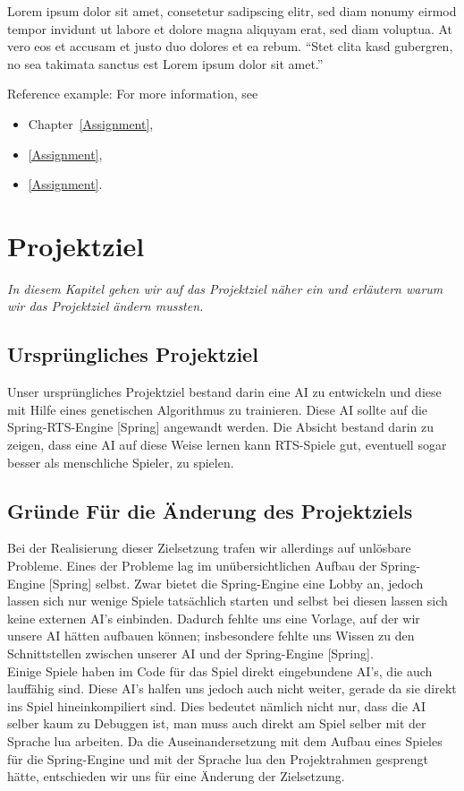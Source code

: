 \documentclass[
	12pt,
	a4paper,
	BCOR10mm,
	DIV14,
	headsepline,
	usegeometry,
]{scrreprt}
\begin{document}
Lorem ipsum dolor sit amet, consetetur sadipscing elitr, sed diam nonumy eirmod tempor invidunt ut labore et dolore magna aliquyam erat, sed diam voluptua.
At vero eos et accusam et justo duo dolores et ea rebum.
“Stet clita kasd gubergren, no sea takimata sanctus est Lorem ipsum dolor sit amet.”~\cite{Quelle2012}

\medskip

Reference example: For more information, see
\begin{itemize}
	\item Chapter~\ref{Assignment},
	\item \cref{Assignment},
	\item \vref{Assignment}.
\end{itemize}

\chapter{Projektziel}
\label{Projektziel}

\textit{%
In diesem Kapitel gehen wir auf das Projektziel näher ein und erläutern warum wir das Projektziel ändern mussten.
}

\bigskip

\section{Ursprüngliches Projektziel}

Unser ursprüngliches Projektziel bestand darin eine AI zu entwickeln und diese mit Hilfe eines genetischen Algorithmus zu trainieren. Diese AI sollte auf die Spring-RTS-Engine [Spring] angewandt werden. Die Absicht bestand darin zu zeigen, dass eine AI auf diese Weise lernen kann RTS-Spiele gut, eventuell sogar besser als menschliche Spieler, zu spielen.\\

\section{Gründe Für die Änderung des Projektziels}
Bei der Realisierung dieser Zielsetzung trafen wir allerdings auf unlösbare Probleme. Eines der Probleme lag im unübersichtlichen Aufbau der Spring-Engine [Spring] selbst. Zwar bietet die Spring-Engine eine Lobby an, jedoch lassen sich nur wenige Spiele tatsächlich starten und selbst bei diesen lassen sich keine externen AI's einbinden. Dadurch fehlte uns eine Vorlage, auf der wir unsere AI hätten aufbauen können; insbesondere fehlte uns Wissen zu den Schnittstellen zwischen unserer AI und der Spring-Engine [Spring]. \\
Einige Spiele haben im Code für das Spiel direkt eingebundene AI's, die auch lauffähig sind. Diese AI's halfen uns jedoch auch nicht weiter, gerade da sie direkt ins Spiel hineinkompiliert sind. Dies bedeutet nämlich nicht nur, dass die AI selber kaum zu Debuggen ist, man muss auch direkt am Spiel selber mit der Sprache lua arbeiten. Da die Auseinandersetzung mit dem Aufbau eines Spieles für die Spring-Engine und mit der Sprache lua den Projektrahmen gesprengt hätte, entschieden wir uns für eine Änderung der Zielsetzung.
\end{document}
